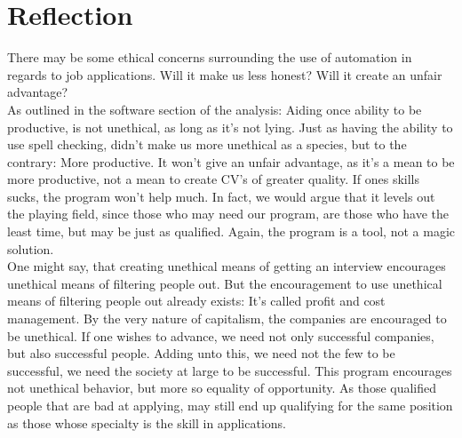 \section{Reflection}

\newpage
There may be some ethical concerns surrounding the use of automation in regards to job applications.
Will it make us less honest? Will it create an unfair advantage?\\
As outlined in the software section of the analysis: Aiding once ability to be productive, is not unethical, as long as it's not lying.
Just as having the ability to use spell checking, didn't make us more unethical as a species, but to the contrary: More productive.
It won't give an unfair advantage, as it's a mean to be more productive, not a mean to create CV's of greater quality. If ones skills sucks, the program won't help much.
In fact, we would argue that it levels out the playing field, since those who may need our program, are those who have the least time, but may be just as qualified. Again, the program is a tool, not a magic solution.\\

One might say, that creating unethical means of getting an interview encourages unethical means of filtering people out.
But the encouragement to use unethical means of filtering people out already exists:
It's called profit and cost management. By the very nature of capitalism, the companies are encouraged to be unethical.
If one wishes to advance, we need not only successful companies, but also successful people.
Adding unto this, we need not the few to be successful, we need the society at large to be successful. This program encourages not unethical behavior, but more so equality of opportunity.
As those qualified people that are bad at applying, may still end up qualifying for the same position as those whose specialty is the skill in applications.